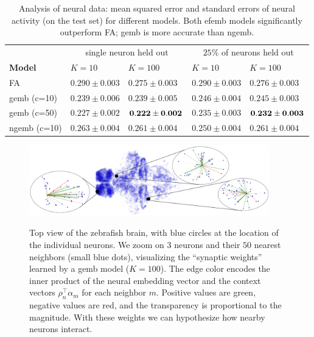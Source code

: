 \documentclass[12pt]{article}
\begin{document}
\begin{table}[]
\centering
\small
\begin{tabular}{lllll}
\toprule
                       & \multicolumn{2}{c}{single neuron held out}   & \multicolumn{2}{c}{$25\%$ of neurons held out} \\
  {\bf Model}                & $K=10           $          &$ K=100          $ &$ K=10            $      &$ K=100           $     \\
  \hline
  \gls{FA}             & $0.290\pm 0.003 $         &$ 0.275 \pm 0.003$     &$ 0.290 \pm 0.003 $      &$ 0.276 \pm 0.003 $     \\
  \gls{gemb} (c=10)    & $0.239\pm 0.006 $         &$ 0.239\pm 0.005 $     &$ 0.246 \pm 0.004 $      &$ 0.245 \pm 0.003 $     \\
  \gls{gemb} (c=50)    & $0.227\pm 0.002 $         &$ {\bf 0.222\pm 0.002}$&$ 0.235 \pm 0.003 $      &$ {\bf 0.232 \pm 0.003} $     \\
  \gls{ngemb} (c=10)   & $0.263\pm 0.004 $         &$ 0.261\pm 0.004 $     &$ 0.250 \pm 0.004 $      &$ 0.261 \pm 0.004 $     \\
  \bottomrule
\end{tabular}
\caption{Analysis of neural data: mean squared error and standard
  errors of neural activity (on the test set) for different models.
  Both \gls{efemb} models significantly outperform \gls{FA};
  \gls{gemb} is more accurate than \gls{ngemb}.
}
\label{tab:results}
\vspace{-7pt}
\end{table}
\begin{figure}[t]
  \centering
  {\includegraphics[width=0.93\textwidth]{map_connection.png}}
  \caption{ Top view of the zebrafish brain, with blue circles at the
    location of the individual neurons. We zoom on 3 neurons and their
    $50$ nearest neighbors (small blue dots), visualizing the
    ``synaptic weights'' learned by a \gls{gemb} model ($K=100$).
    The edge color encodes the inner product of the neural embedding
    vector and the context vectors $\rho_n^\top\alpha_m$ for
    each neighbor $m$. Positive values are green, negative values are
    red, and the transparency is proportional to the magnitude. With
    these weights we can hypothesize how nearby neurons interact. }
\label{fig:neuro}
\vspace{-5pt}
\end{figure}
\end{document}
